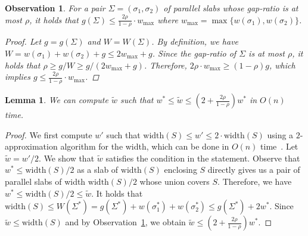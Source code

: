\documentclass[10pt,a4paper]{article}
\newtheorem{lemma}[theorem]{Lemma}
\newtheorem{observation}[theorem]{Observation}
\theoremstyle{star}
\theoremstyle{claimstar}
\newcommand{\width}{\ensuremath{\mathrm{width}}}
\begin{document}
\begin{observation}
    \label{obs:gap_ratio}
    For a pair $\Sigma = (\sigma_1, \sigma_2)$ of parallel slabs  whose gap-ratio is at most $\rho$,
    it holds that $g(\Sigma) \le \frac{2\rho}{1-\rho} \cdot w_{\max}$ where $w_{\max} = \max \{w(\sigma_1), w(\sigma_2)\}$. 

\begin{proof}
    Let $g = g(\Sigma)$ and $W = W(\Sigma)$.
    By definition, we have $W = w(\sigma_1) + w(\sigma_2) + g \le 2w_{\max} + g$.
    Since the gap-ratio of $\Sigma$ is at most $\rho$, it holds that $\rho \ge g/W \ge g/(2w_{\max} + g)$.
    Therefore, $2\rho\cdot w_{\max} \ge (1-\rho)g$, which implies $g \le \frac{2\rho}{1-\rho}\cdot w_{\max}$.   
\end{proof}
    
\end{observation}

\begin{lemma}
\label{lem:small_gap_const}
We can compute $\widetilde w$ such that $w^* \le \widetilde w \le (2 + \frac{2\rho}{1-\rho} ) w^* $ in $O(n)$ time.
\end{lemma}

\begin{proof}
We first compute $w'$ such that $\width(S) \le w' \le 2\cdot \width(S)$ using a $2$-approximation algorithm for the width, 
which can be done in $O(n)$ time~\cite{chan2006faster}. 
Let $\widetilde w = w'/2$. 
We show that $\widetilde w$ satisfies the condition in the statement. Observe that $w^* \le \width(S)/2$ as a slab of $\width(S)$ enclosing $S$ directly gives us a pair of parallel slabs of width $\width(S)/2$ whose union covers $S$. 
Therefore, we have $w^* \le \width(S)/2 \le \widetilde w$. It holds that $\width(S) \le W(\Sigma^*) = g(\Sigma^*) + w(\sigma_1^*) + w(\sigma_2^*) \le g(\Sigma^*) + 2w^*$. Since $\widetilde w \le \width(S)$ and by Observation~\ref{obs:gap_ratio}, we obtain $\widetilde w \le (2 + \frac{2\rho}{1-\rho}) w^*$.
\end{proof}



\end{document}
